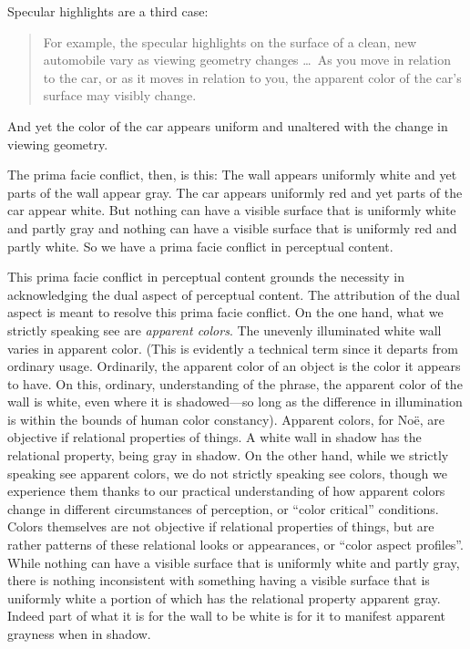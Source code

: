 \documentclass[12pt]{article}
\begin{document}
Specular highlights are a third case:
	\begin{quote}
		For example, the specular highlights on the surface of a clean, new automobile vary as viewing geometry changes \ldots\ As you move in relation to the car, or as it moves in relation to you, the apparent color of the car's surface may visibly change.
	\end{quote}
And yet the color of the car appears uniform and unaltered with the change in viewing geometry.

The prima facie conflict, then, is this: The wall appears uniformly white and yet parts of the wall appear gray. The car appears uniformly red and yet parts of the car appear white. But nothing can have a visible surface that is uniformly white and partly gray and nothing can have a visible surface that is uniformly red and partly white. So we have a prima facie conflict in perceptual content.

This prima facie conflict in perceptual content grounds the necessity in acknowledging the dual aspect of perceptual content. The attribution of the dual aspect is meant to resolve this prima facie conflict. On the one hand, what we strictly speaking see are \emph{apparent colors}. The unevenly illuminated white wall varies in apparent color. (This is evidently a technical term since it departs from ordinary usage. Ordinarily, the apparent color of an object is the color it appears to have. On this, ordinary, understanding of the phrase, the apparent color of the wall is white, even where it is shadowed---so long as the difference in illumination is within the bounds of human color constancy). Apparent colors, for Noë, are objective if relational properties of things. A white wall in shadow has the relational property, being gray in shadow. On the other hand, while we strictly speaking see apparent colors, we do not strictly speaking see colors, though we experience them thanks to our practical understanding of how apparent colors change in different circumstances of perception, or ``color critical'' conditions. Colors themselves are not objective if relational properties of things, but are rather patterns of these relational looks or appearances, or ``color aspect profiles''. While nothing can have a visible surface that is uniformly white and partly gray, there is nothing inconsistent with something having a visible surface that is uniformly white a portion of which has the relational property apparent gray. Indeed part of what it is for the wall to be white is for it to manifest apparent grayness when in shadow.
\end{document}
